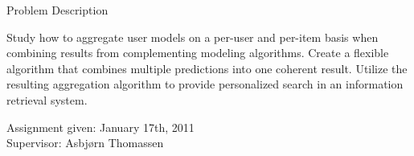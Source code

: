 \null\vspace{13em}
{
  \centering
  \normalfont
  \huge
  Problem Description\\
}
\vspace{2em}

\noindent
Study how to aggregate user models on a per-user and per-item
basis when combining results from complementing modeling algorithms.
Create a flexible algorithm that combines multiple predictions
into one coherent result.
Utilize the resulting aggregation algorithm
to provide personalized search in an information retrieval system.

\vspace{1em}
\begin{flushleft}


  Assignment given: January 17th, 2011\\
  Supervisor: Asbjørn Thomassen\\


\end{flushleft}

\cleardoublepage
